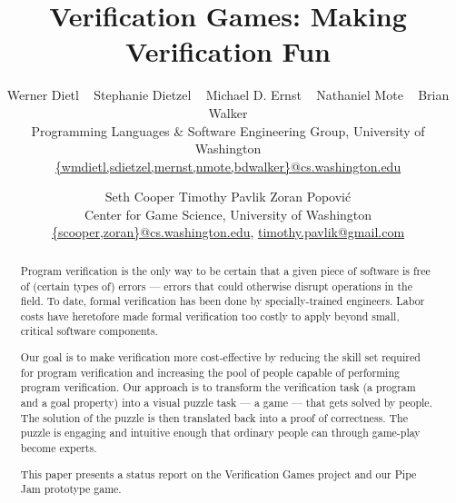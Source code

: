 \documentclass{sig-alternate}
\begin{document}
\title{Verification Games: Making Verification Fun}



\author{
Werner Dietl
\ \quad
Stephanie Dietzel
\ \quad
Michael D. Ernst
\ \quad
Nathaniel Mote
\ \quad
Brian Walker\\
%
{\normalsize
Programming Languages \& Software Engineering Group,
University of Washington}\\
\url{{wmdietl,sdietzel,mernst,nmote,bdwalker}@cs.washington.edu}
%
\and
%
Seth Cooper
\qquad
Timothy Pavlik
\qquad
Zoran Popovi\'c\\
%
{\normalsize
Center for Game Science, University of Washington}\\
\url{{scooper,zoran}@cs.washington.edu},
\url{timothy.pavlik@gmail.com}
}

\date{}

\maketitle

\begin{abstract}
Program verification is the only way to be certain that a given
piece of software is free of (certain types of) errors --- errors that
could otherwise disrupt operations in the field.  To date, formal
verification has been done by specially-trained engineers.  Labor
costs have heretofore made formal verification too costly to apply beyond
small, critical software components.

Our goal is to make verification more cost-effective by reducing the skill
set required for program verification and increasing the pool of people
capable of performing program verification.  Our approach is to transform
the verification task (a program and a goal property)
into a visual puzzle task --- a game --- that
gets solved by people. The solution of the puzzle is then translated
back into a proof of correctness.
The puzzle is engaging and intuitive enough that ordinary people can through
game-play become experts.

This paper presents a 
status report on the Verification Games
project and our Pipe Jam prototype game.



\end{abstract}

\end{document}
